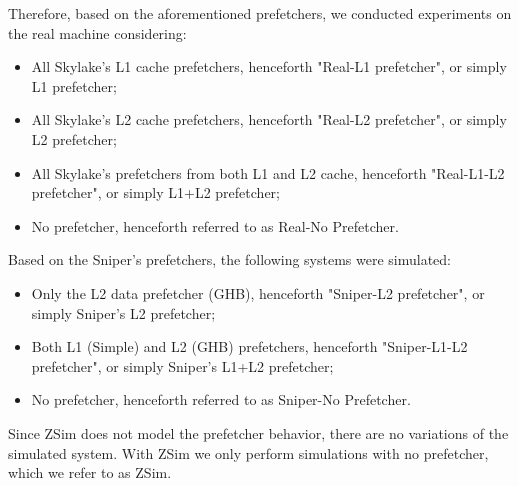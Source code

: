 \documentclass[AMA,final,STIX1COL]{WileyNJD-v2}
\begin{document}
Therefore, based on the aforementioned prefetchers, we conducted experiments on the real machine considering: %
\begin{itemize}
    \item All Skylake's L1 cache prefetchers, henceforth "Real-L1 prefetcher", or simply L1 prefetcher;
    \item All Skylake's L2 cache prefetchers, henceforth "Real-L2 prefetcher", or simply L2 prefetcher;
    \item All Skylake's prefetchers from both L1 and L2 cache, henceforth "Real-L1-L2 prefetcher", or simply L1+L2 prefetcher;
    \item No prefetcher, henceforth referred to as Real-No Prefetcher.
\end{itemize}

Based on the Sniper's prefetchers, the following systems were simulated:
\begin{itemize}
    \item Only the L2 data prefetcher (GHB), henceforth "Sniper-L2 prefetcher", or simply Sniper's L2 prefetcher;
    \item Both L1 (Simple) and L2 (GHB) prefetchers, henceforth "Sniper-L1-L2 prefetcher", or simply Sniper's L1+L2 prefetcher;
    \item No prefetcher, henceforth referred to as Sniper-No Prefetcher.
\end{itemize}

Since ZSim does not model the prefetcher behavior, there are no variations of the simulated system. With ZSim we only perform simulations with no prefetcher, which we refer to as ZSim.
\end{document}
